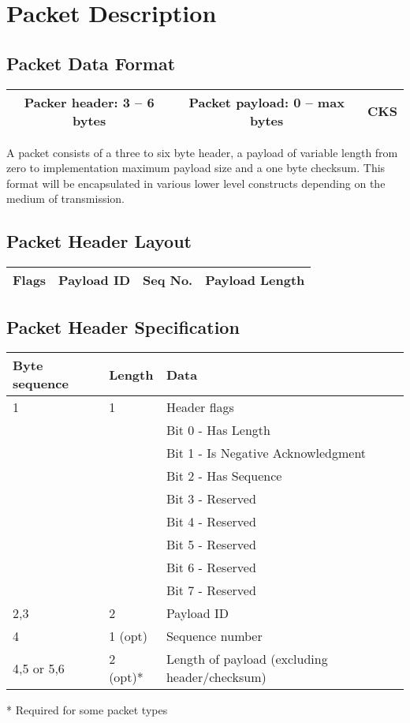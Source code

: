 \documentclass[12pt,a4paper,titlepage]{article}
\begin{document}
\section{Packet Description}

\subsection{Packet Data Format}
\begin{center}
\begin{tabular}{|c|c|c|}
\hline Packer header: 3 -- 6 bytes & Packet payload: 0 -- max bytes & CKS \\
\hline
\end{tabular} 
\end{center}

A packet consists of a three to six byte header, a payload of variable length
from zero to implementation maximum payload size and a one byte checksum. This
format will be encapsulated in various lower level constructs depending on the
medium of transmission.

\subsection{Packet Header Layout}
\begin{center}
\begin{tabular}{|c|c|c|c|}
\hline Flags & Payload ID & Seq No. & Payload Length \\
\hline
\end{tabular} 
\end{center}

\subsection{Packet Header Specification}

\begin{center}
\begin{tabular}{|l|l|l|}
\hline Byte sequence & Length & Data \\ 
\hline 1 & 1 & Header flags \\
\multirow{8}{*}{} & \multirow{8}{*}{} & Bit 0 - Has Length \\
&& Bit 1 - Is Negative Acknowledgment \\
&& Bit 2 - Has Sequence \\
&& Bit 3 - Reserved \\
&& Bit 4 - Reserved \\
&& Bit 5 - Reserved \\
&& Bit 6 - Reserved \\
&& Bit 7 - Reserved \\
\hline 2,3 & 2 & Payload ID \\ 
\hline 4 & 1 (opt) & Sequence number \\ 
\hline 4,5 or 5,6 & 2 (opt)* & Length of payload (excluding header/checksum) \\ 
\hline 
\end{tabular} 
\end{center}
  * Required for some packet types
  
\end{document}
